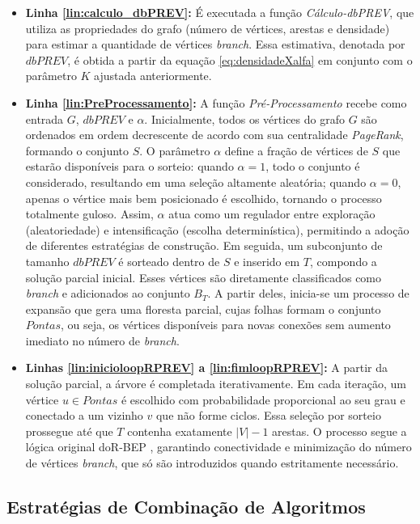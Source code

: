 \begin{itemize}
    \item \textbf{Linha \ref{lin:calculo_dbPREV}:} 
    É executada a função \textit{Cálculo-dbPREV}, que utiliza as propriedades do grafo (número de vértices, arestas e densidade) para estimar a quantidade de vértices \textit{branch}. Essa estimativa, denotada por $dbPREV$, é obtida a partir da equação \ref{eq:densidadeXalfa} em conjunto com o parâmetro $K$ ajustada anteriormente.

    \item \textbf{Linha \ref{lin:PreProcessamento}:} 
    A função \textit{Pré-Processamento} recebe como entrada $G$, $dbPREV$ e $\alpha$. Inicialmente, todos os vértices do grafo $G$ são ordenados em ordem decrescente de acordo com sua centralidade \textit{PageRank}, formando o conjunto $S$. O parâmetro $\alpha$ define a fração de vértices de $S$ que estarão disponíveis para o sorteio: quando $\alpha = 1$, todo o conjunto é considerado, resultando em uma seleção altamente aleatória; quando $\alpha = 0$, apenas o vértice mais bem posicionado é escolhido, tornando o processo totalmente guloso. Assim, $\alpha$ atua como um regulador entre exploração (aleatoriedade) e intensificação (escolha determinística), permitindo a adoção de diferentes estratégias de construção. Em seguida, um subconjunto de tamanho $dbPREV$ é sorteado dentro de $S$ e inserido em $T$, compondo a solução parcial inicial. Esses vértices são diretamente classificados como \textit{branch} e adicionados ao conjunto $B_T$. A partir deles, inicia-se um processo de expansão que gera uma floresta parcial, cujas folhas formam o conjunto $Pontas$, ou seja, os vértices disponíveis para novas conexões sem aumento imediato no número de \textit{branch}.

    \item \textbf{Linhas \ref{lin:inicioloopRPREV} a \ref{lin:fimloopRPREV}:} A partir da solução parcial, a árvore é completada iterativamente. Em cada iteração, um vértice $u \in Pontas$ é escolhido com probabilidade proporcional ao seu grau e conectado a um vizinho $v$ que não forme ciclos. Essa seleção por sorteio prossegue até que $T$ contenha exatamente $|V|-1$ arestas. O processo segue a lógica original doR-BEP \citep{oliveira:2023}, garantindo conectividade e minimização do número de vértices \textit{branch}, que só são introduzidos quando estritamente necessário.

\end{itemize}

\subsection{Estratégias de Combinação de Algoritmos}
\label{sec-metodo-combinacao-algoritmos}

